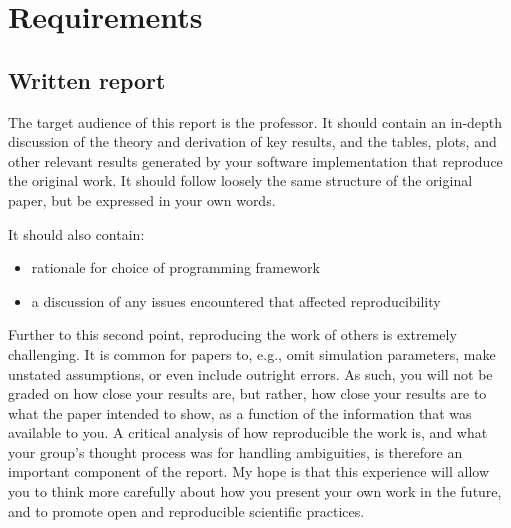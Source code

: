 \section{Requirements}

\subsection{Written report}
The target audience of this report is the professor. It should contain an in-depth discussion of the theory and derivation of key results, and the tables, plots, and other relevant results generated by your software implementation that reproduce the original work. It should follow loosely the same structure of the original paper, but be expressed in your own words.

It should also contain:
\begin{itemize}
    \item rationale for choice of programming framework
    \item a discussion of any issues encountered that affected reproducibility
\end{itemize}

Further to this second point, reproducing the work of others is extremely challenging. It is common for papers to, e.g., omit simulation parameters, make unstated assumptions, or even include outright errors. As such, you will not be graded on how close your results are, but rather, how close your results are to what the paper intended to show, as a function of the information that was available to you. A critical analysis of how reproducible the work is, and what your group's thought process was for handling ambiguities, is therefore an important component of the report. My hope is that this experience will allow you to think more carefully about how you present your own work in the future, and to promote open and reproducible scientific practices.
